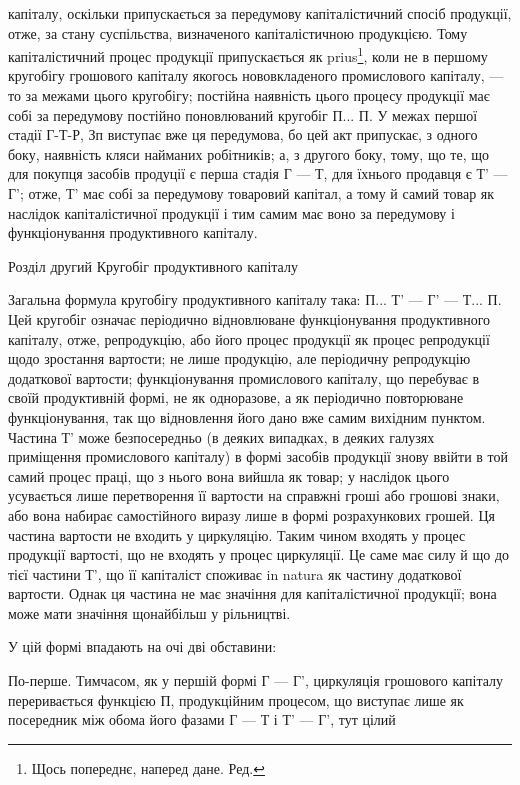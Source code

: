 \parcont{}  %
капіталу, оскільки припускається за передумову капіталістичний спосіб
продукції, отже, за стану суспільства, визначеного капіталістичною продукцією.
Тому капіталістичний процес продукції припускається як prius\footnote*{
Щось попереднє, наперед дане. Ред.
},
коли не в першому кругобігу грошового капіталу якогось нововкладеного
промислового капіталу, — то за межами цього кругобігу; постійна наявність
цього процесу продукції має собі за передумову постійно поновлюваний кругобіг П... П. У межах першої
стадії Г-Т-Р, Зп виступає вже ця передумова, бо цей акт припускає, з одного боку, наявність кляси
найманих робітників; а, з другого боку, тому, що те, що для покупця
засобів продуції є перша стадія Г — Т, для їхнього продавця є Т' — Г';
отже, Т' має собі за передумову товаровий капітал, а тому й самий
товар як наслідок капіталістичної продукції і тим самим має воно за
передумову і функціонування продуктивного капіталу.

Розділ другий
Кругобіг продуктивного капіталу

Загальна формула кругобігу продуктивного капіталу така: П... Т' —
Г' — Т... П. Цей кругобіг означає періодично відновлюване функціонування
продуктивного капіталу, отже, репродукцію, або його процес
продукції як процес репродукції щодо зростання вартости; не лише
продукцію, але періодичну репродукцію додаткової вартости; функціонування
промислового капіталу, що перебуває в своїй продуктивній формі,
не як одноразове, а як періодично повторюване функціонування, так що
відновлення його дано вже самим вихідним пунктом. Частина Т' може
безпосередньо (в деяких випадках, в деяких галузях приміщення промислового
капіталу) в формі засобів продукції знову ввійти в той самий
процес праці, що з нього вона вийшла як товар; у наслідок цього усувається
лише перетворення її вартости на справжні гроші або грошові
знаки, або вона набирає самостійного виразу лише в формі розрахункових
грошей. Ця частина вартости не входить у циркуляцію. Таким чином
входять у процес продукції вартості, що не входять у процес циркуляції.
Це саме має силу й що до тієї частини Т', що її капіталіст споживає
in natura як частину додаткової вартости. Однак ця частина не має значіння
для капіталістичної продукції; вона може мати значіння щонайбільш
у рільництві.

У цій формі впадають на очі дві обставини:

По-перше. Тимчасом, як у першій формі Г — Г', циркуляція грошового
капіталу переривається функцією П, продукційним процесом, що виступає
лише як посередник між обома його фазами Г — Т і Т' — Г', тут цілий
\parbreak{}  %
